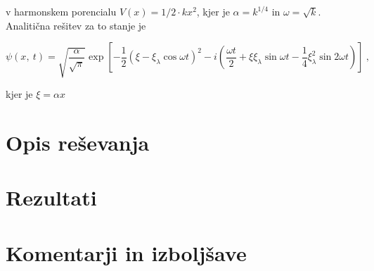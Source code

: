 \documentclass[a4paper]{article}
\begin{document}
v harmonskem porencialu $V(x) = 1/2\cdot k x^2$, kjer je $\alpha = k^{1/4}$ in $\omega = \sqrt{k}$.
Analitična rešitev za to stanje je

\begin{equation}
    \psi(x,\>t) = \sqrt{\frac{\alpha}{\sqrt{\pi}}} \exp{\left[-\frac{1}{2}(\xi - 
    \xi_\lambda \cos{\omega t})^2-
    i\left(\frac{\omega t}{2} + \xi\xi_\lambda \sin{\omega t} - 
    \frac{1}{4}\xi_\lambda^2\sin{2\omega t}\right)\right]}\>,
    \label{analiticna_resitev1}
\end{equation}

kjer je $\xi=\alpha x$


\section{Opis reševanja}

\section{Rezultati}


\section{Komentarji in izboljšave}


\newpage


\end{document}
